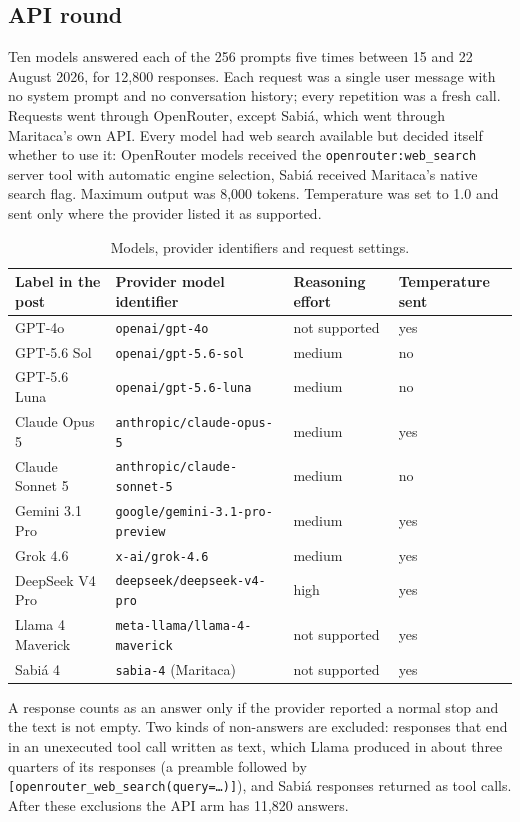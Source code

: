 \documentclass[11pt]{article}
\begin{document}
\subsection{API round}

Ten models answered each of the 256 prompts five times between 15 and 22 August 2026, for 12,800 responses. Each request was a single user message with no system prompt and no conversation history; every repetition was a fresh call. Requests went through OpenRouter, except Sabiá, which went through Maritaca's own API. Every model had web search available but decided itself whether to use it: OpenRouter models received the \texttt{openrouter:web\_search} server tool with automatic engine selection, Sabiá received Maritaca's native search flag. Maximum output was 8,000 tokens. Temperature was set to 1.0 and sent only where the provider listed it as supported.

\begin{table}[h]\centering\footnotesize\setlength{\tabcolsep}{5pt}
\caption{Models, provider identifiers and request settings.}
\begin{tabular}{@{}llll@{}}
\toprule
Label in the post & Provider model identifier & Reasoning effort & Temperature sent \\
\midrule
GPT-4o & \texttt{openai/gpt-4o} & not supported & yes \\
GPT-5.6 Sol & \texttt{openai/gpt-5.6-sol} & medium & no \\
GPT-5.6 Luna & \texttt{openai/gpt-5.6-luna} & medium & no \\
Claude Opus 5 & \texttt{anthropic/claude-opus-5} & medium & yes \\
Claude Sonnet 5 & \texttt{anthropic/claude-sonnet-5} & medium & no \\
Gemini 3.1 Pro & \texttt{google/gemini-3.1-pro-preview} & medium & yes \\
Grok 4.6 & \texttt{x-ai/grok-4.6} & medium & yes \\
DeepSeek V4 Pro & \texttt{deepseek/deepseek-v4-pro} & high & yes \\
Llama 4 Maverick & \texttt{meta-llama/llama-4-maverick} & not supported & yes \\
Sabiá 4 & \texttt{sabia-4} (Maritaca) & not supported & yes \\
\bottomrule
\end{tabular}
\end{table}

A response counts as an answer only if the provider reported a normal stop and the text is not empty. Two kinds of non-answers are excluded: responses that end in an unexecuted tool call written as text, which Llama produced in about three quarters of its responses (a preamble followed by \texttt{[openrouter\_web\_search(query=\ldots)]}), and Sabiá responses returned as tool calls. After these exclusions the API arm has 11,820 answers.
\end{document}
